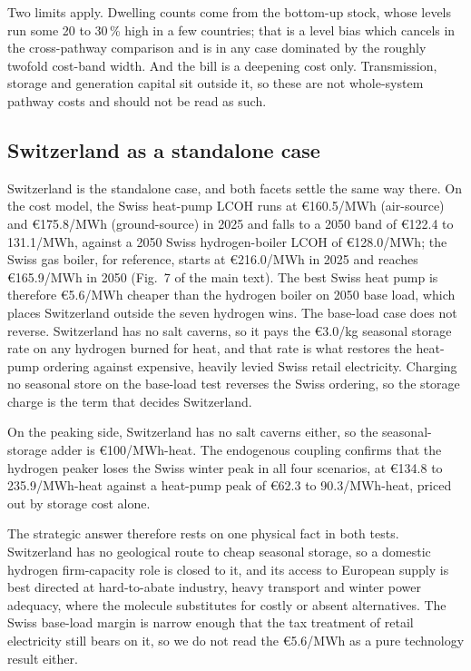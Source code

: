 Two limits apply. Dwelling counts come from the bottom-up stock, whose levels run some 20
to 30\,\% high in a few countries; that is a level bias which cancels in the cross-pathway
comparison and is in any case dominated by the roughly twofold cost-band width. And the
bill is a deepening cost only. Transmission, storage and generation capital sit outside
it, so these are not whole-system pathway costs and should not be read as such.

\subsection{Switzerland as a standalone case}
\label{sec:results:switzerland}

Switzerland is the standalone case, and both facets settle the same way there. On the cost model, the Swiss heat-pump
LCOH runs at
\euro{}160.5/MWh (air-source) and \euro{}175.8/MWh (ground-source) in 2025 and falls to
a 2050 band of \euro{}122.4 to 131.1/MWh, against a 2050 Swiss hydrogen-boiler LCOH of
\euro{}128.0/MWh; the Swiss gas boiler, for reference, starts at
\euro{}216.0/MWh in 2025 and reaches \euro{}165.9/MWh in 2050 (Fig.~7 of the main text).
The best Swiss heat pump is therefore \euro{}5.6/MWh cheaper than the hydrogen boiler
on 2050 base load, which places Switzerland outside the seven hydrogen wins. The
base-load case does not reverse. Switzerland has no salt caverns, so it pays the
\euro{}3.0/kg seasonal storage rate on any hydrogen burned for heat, and that rate is
what restores the heat-pump ordering against expensive, heavily levied Swiss retail
electricity. Charging no seasonal store on the base-load test reverses the Swiss
ordering, so the storage charge is the term that decides Switzerland.

On the peaking side, Switzerland has no salt caverns either, so the seasonal-storage adder is
\euro{}100/MWh-heat. The endogenous
coupling confirms that the hydrogen peaker loses the Swiss winter peak in all four
scenarios, at \euro{}134.8 to 235.9/MWh-heat against a heat-pump peak of \euro{}62.3 to
90.3/MWh-heat, priced out by storage cost alone.

The strategic answer therefore rests on one physical fact in both tests. Switzerland has no geological route to cheap seasonal
storage, so a domestic
hydrogen firm-capacity role is closed to it, and its access to European supply is best
directed at hard-to-abate industry, heavy transport and winter power
adequacy, where the molecule substitutes for costly or absent alternatives. The Swiss
base-load margin is narrow enough that the tax treatment of retail electricity still
bears on it, so we do not read the \euro{}5.6/MWh as a pure technology result either.


